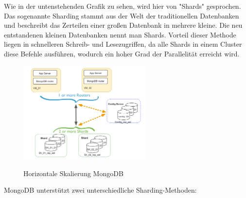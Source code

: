 Wie in der untenstehenden Grafik zu sehen, wird hier von "Shards" gesprochen. Das sogenannte Sharding stammt aus der Welt der traditionellen Datenbanken und beschreibt das Zerteilen einer großen Datenbank in mehrere kleine. Die neu entstandenen kleinen Datenbanken nennt man Shards. Vorteil dieser Methode liegen in schnelleren Schreib- und Lesezugriffen, da alle Shards in einem Cluster diese Befehle ausführen, wodurch ein hoher Grad der Parallelität erreicht wird.
\newline
\begin{figure}[h!]
    \centering
    \includegraphics[width=0.6\textwidth]{pics/vertical_scaling_mongodb.png}
    \caption{Horizontale Skalierung MongoDB}
    \cite{vertical_scaling_mongodb}
    \label{fig:enter-label}
\end{figure}
\newline
MongoDB unterstützt zwei unterschiedliche Sharding-Methoden:
